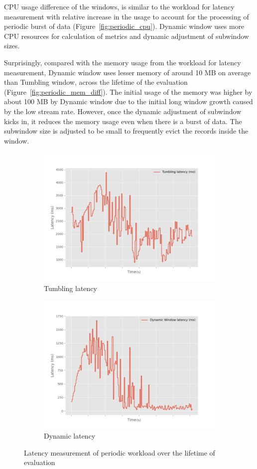 CPU usage difference of the windows, is similar to the workload for latency measurement with relative increase 
in the usage to account for the processing of periodic burst of data
(Figure~\ref{fig:periodic_cpu}). Dynamic window uses more CPU resources for 
calculation of metrics and dynamic adjustment of subwindow sizes. 

Surprisingly, compared with the memory usage from the workload for latency measurement, Dynamic window uses 
lesser memory of around 10 MB on average than Tumbling window, across the lifetime of the evaluation (Figure~\ref{fig:periodic_mem_diff}). 
The initial usage of the memory was higher by about 100 MB by Dynamic window due to the initial long window growth 
caused by the low stream rate. However, once 
the dynamic adjustment of subwindow kicks in, it reduces the memory usage even when there is a burst of data. The subwindow size
is adjusted to be small to frequently evict the records inside the window. 

\begin{figure}
    \begin{subfigure}[b]{\columnwidth}
        \centering
        \includegraphics[width=0.7\columnwidth]{fig/periodic/Tumbling_latency_lineplot.png}
        \caption{Tumbling latency }
        \label{fig:periodic_tumbling_lineplot}
    \end{subfigure}

    \begin{subfigure}[b]{\columnwidth}
        \centering
        \includegraphics[width=0.7\columnwidth]{fig/periodic/DynamicWindow_latency_lineplot.png}
        \caption{Dynamic latency }
        \label{fig:periodic_dynamic_lineplot}
    \end{subfigure}
    \caption{Latency measurement of periodic workload over the lifetime of evaluation}
    \label{fig:periodic_latency_lineplot}
\end{figure}

